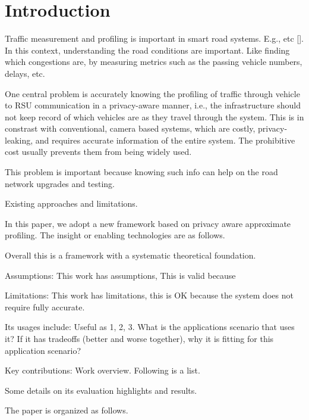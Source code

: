 \section{Introduction}
\label{intro}

Traffic measurement and profiling is important in smart road systems. E.g., etc []. In this context, understanding the road conditions are important. Like finding which congestions are, by measuring metrics such as the passing vehicle numbers, delays, etc. 

One central problem is accurately knowing the profiling of traffic through vehicle to RSU communication in a privacy-aware manner, i.e., the infrastructure should not keep record of which vehicles are as they travel through the system. This is in constrast with conventional, camera based systems, which are costly, privacy-leaking, and requires accurate information of the entire system. The prohibitive cost usually prevents them from being widely used. 

This problem is important because knowing such info can help on the road network upgrades and testing. 

Existing approaches and limitations. 

In this paper, we adopt a new framework based on privacy aware approximate profiling. The insight or enabling technologies are as follows.  

Overall this is a framework with a systematic theoretical foundation.  

Assumptions: This work has assumptions, This is valid because 

Limitations: This work has limitations,  this is OK because the system does not require fully accurate. 

Its usages include: Useful as 1, 2, 3. What is the applications scenario that uses it? If it has tradeoffs (better and worse together), why it is fitting for this application scenario?
 
Key contributions: Work overview. Following is a list. 

Some details on its evaluation highlights and results.

The paper is organized as follows. 
 















